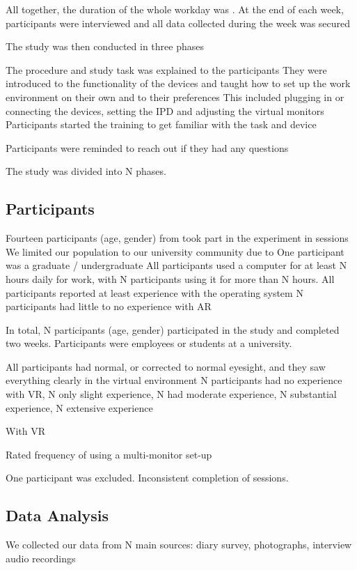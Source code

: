 All together, the duration of the whole workday was .
At the end of each week, participants were interviewed and all data collected during the week was secured 

The study was then conducted in three phases 

The procedure and study task was explained to the participants 
They were introduced to the functionality of the devices and taught how to set up the work environment on their own and to their preferences 
This included plugging in or connecting the devices, setting the IPD and adjusting the virtual monitors 
Participants started the training to get familiar with the task and  device

Participants were reminded to reach out if they had any questions

The study was divided into N phases. 


\subsection{Participants}
Fourteen participants (age, gender) from 
took part in the experiment in sessions 
We limited our population to our university community due to 
One participant was a graduate / undergraduate 
All participants used a computer for at least N hours daily for work, with N participants using it for more than N hours. 
All participants reported at least  experience with the operating system 
N participants had little to no experience with AR

In total, N participants (age, gender) participated in the study and completed two weeks.
Participants were employees or students at a university. 

All participants had normal, or corrected to normal eyesight, and they saw everything clearly in the virtual environment
N participants had no experience with VR, 
N only slight experience, 
N had moderate experience, 
N substantial experience,
N extensive experience 

With VR

Rated frequency of using a multi-monitor set-up 

One participant was excluded. 
Inconsistent completion of sessions. 


\subsection{Data Analysis}
We collected our data from N main sources: 
diary survey, photographs, interview audio recordings 

